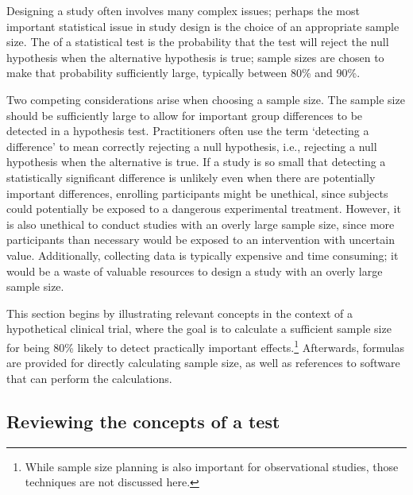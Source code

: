 Designing a study often involves many complex issues; perhaps the most important statistical issue in study design is the choice of an appropriate sample size. The  of a statistical test is the probability that the test will reject the null hypothesis when the alternative hypothesis is true; sample sizes are chosen to make that probability sufficiently large, typically between 80\% and 90\%. 

Two competing considerations arise when choosing a sample size. The sample size should be sufficiently large to allow for important group differences to be detected in a hypothesis test. Practitioners often use the term `detecting a difference' to mean correctly rejecting a null hypothesis, i.e., rejecting a null hypothesis when the alternative is true. If a study is so small that detecting a statistically significant difference is unlikely even when there are potentially important differences, enrolling participants might be unethical, since subjects could potentially be exposed to a dangerous experimental treatment. However, it is also unethical to conduct studies with an overly large sample size, since more participants than necessary would be exposed to an intervention with uncertain value. Additionally, collecting data is typically expensive and time consuming; it would be a waste of valuable resources to design a study with an overly large sample size.

This section begins by illustrating relevant concepts in the context of a hypothetical clinical trial, where the goal is to calculate a sufficient sample size for being 80\% likely to detect practically important effects.\footnote{While sample size planning is also important for observational studies, those techniques are not discussed here.} Afterwards, formulas are provided for directly calculating sample size, as well as references to software that can perform the calculations.

\subsection{Reviewing the concepts of a test}

